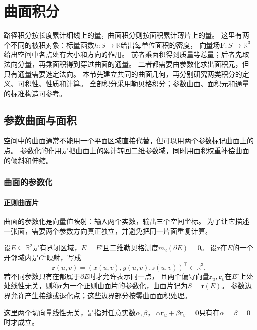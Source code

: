 \par{}
\section{曲面积分}
\label{sec:analysis-surface-integration}

路径积分按长度累计细线上的量，曲面积分则按面积累计薄片上的量。
这里有两个不同的被积对象：标量函数$h:S\to\mathbb R$给出每单位面积的密度，
向量场$\bm F:S\to\mathbb R^3$给出空间中各点处有大小和方向的作用。
前者乘面积得到质量等总量；后者先取法向分量，再乘面积得到穿过曲面的通量。
二者都需要由参数化求出面积元，但只有通量需要选定法向。
本节先建立共同的曲面几何，再分别研究两类积分的定义、可积性、性质和计算。
全部积分采用勒贝格积分；参数曲面、面积元和通量的标准构造可参考。

\subsection{参数曲面与面积}

空间中的曲面通常不能用一个平面区域直接代替，但可以用两个参数标记曲面上的点。
参数化的作用是把曲面上的累计转回二维参数域，同时用面积权重补偿曲面的倾斜和伸缩。

\subsubsection{曲面的参数化}

\paragraph{正则曲面片}

曲面的参数化是向量值映射：输入两个实数，输出三个空间坐标。
为了让它描述一张面，需要两个参数方向真正独立，并避免把同一片面重复计算。

\begin{definition}[正则参数曲面片]
\label{def:analysis-regular-surface-patch}
设$E\subseteq\mathbb R^2$是有界闭区域，$E=\overline{E^\circ}$且二维勒贝格测度$m_2(\partial E)=0$。
设$\bm r$在$E$的一个开邻域内是$C^1$映射，写成
\[
 \bm r(u,v)=(x(u,v),y(u,v),z(u,v))^\top\in\mathbb R^3.
\]
若不同参数只有在都属于$\partial E$时才允许表示同一点，
且两个偏导向量$\bm r_u,\bm r_v$在$E^\circ$上处处线性无关，则称$\bm r$为一个正则曲面片的参数化，曲面片记为$S=\bm r(E)$。
参数边界允许产生接缝或退化点；这些边界部分按零曲面面积处理。
\end{definition}

这里两个切向量线性无关，是指对任意实数$\alpha,\beta$，
$\alpha\bm r_u+\beta\bm r_v=\bm0$只有在$\alpha=\beta=0$时才成立。

